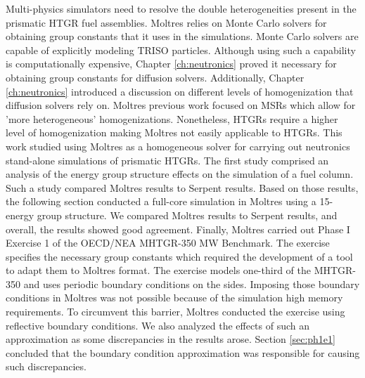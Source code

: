 Multi-physics simulators need to resolve the double heterogeneities present in the prismatic HTGR fuel assemblies.
Moltres relies on Monte Carlo solvers for obtaining group constants that it uses in the simulations.
Monte Carlo solvers are capable of explicitly modeling TRISO particles.
Although using such a capability is computationally expensive, Chapter \ref{ch:neutronics} proved it necessary for obtaining group constants for diffusion solvers.
Additionally, Chapter \ref{ch:neutronics} introduced a discussion on different levels of homogenization that diffusion solvers rely on.
Moltres previous work focused on MSRs which allow for 'more heterogeneous' homogenizations.
Nonetheless, HTGRs require a higher level of homogenization making Moltres not easily applicable to HTGRs.
This work studied using Moltres as a homogeneous solver for carrying out neutronics stand-alone simulations of prismatic HTGRs.
The first study comprised an analysis of the energy group structure effects on the simulation of a fuel column.
Such a study compared Moltres results to Serpent results.
Based on those results, the following section conducted a full-core simulation in Moltres using a 15-energy group structure.
We compared Moltres results to Serpent results, and overall, the results showed good agreement.
Finally, Moltres carried out Phase I Exercise 1 of the OECD/NEA MHTGR-350 MW Benchmark.
The exercise specifies the necessary group constants which required the development of a tool to adapt them to Moltres format.
The exercise models one-third of the MHTGR-350 and uses periodic boundary conditions on the sides.
Imposing those boundary conditions in Moltres was not possible because of the simulation high memory requirements.
To circumvent this barrier, Moltres conducted the exercise using reflective boundary conditions.
We also analyzed the effects of such an approximation as some discrepancies in the results arose.
Section \ref{sec:ph1e1} concluded that the boundary condition approximation was responsible for causing such discrepancies.

